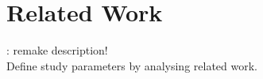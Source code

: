 \chapter{Related Work}
\todo: remake description! \\
Define study parameters by analysing related work.

